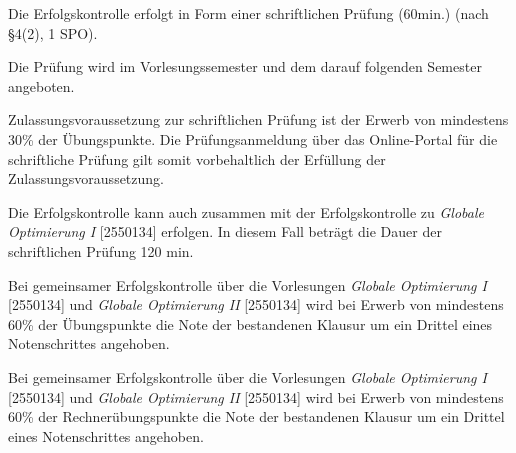 \begin{course}

\setdoclanguagegerman
{}



\coursehead


\label{cour_7881.dp_997}


\begin{styleenv}
\begin{assessment}
Die Erfolgskontrolle erfolgt in Form einer schriftlichen Prüfung (60min.) (nach §4(2), 1 SPO).

 

Die Prüfung wird im Vorlesungssemester und dem darauf folgenden Semester angeboten.

 

Zulassungsvoraussetzung zur schriftlichen Prüfung ist der Erwerb von mindestens 30\% der Übungspunkte. Die Prüfungsanmeldung über das Online-Portal für die schriftliche Prüfung gilt somit vorbehaltlich der Erfüllung der Zulassungsvoraussetzung.

 

Die Erfolgskontrolle kann auch zusammen mit der Erfolgskontrolle zu \emph{Globale Optimierung I} [2550134] erfolgen. In diesem Fall beträgt die Dauer der schriftlichen Prüfung 120 min.

 

Bei gemeinsamer Erfolgskontrolle über die Vorlesungen \emph{Globale Optimierung I} [2550134] und \emph{Globale Optimierung II} [2550134] wird bei Erwerb von mindestens 60\% der Übungspunkte die Note der bestandenen Klausur um ein Drittel eines Notenschrittes angehoben.

 

Bei gemeinsamer Erfolgskontrolle über die Vorlesungen \emph{Globale Optimierung I} [2550134] und \emph{Globale Optimierung II} [2550134] wird bei Erwerb von mindestens 60\% der Rechnerübungspunkte die Note der bestandenen Klausur um ein Drittel eines Notenschrittes angehoben.



\end{assessment}
\end{styleenv}
\end{course}
